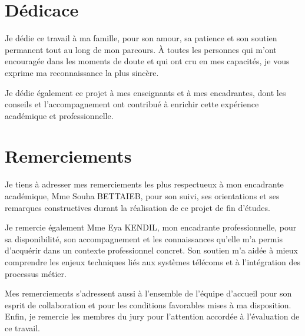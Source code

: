 \documentclass[12pt,a4paper]{report}
\begin{document}

\chapter*{Dédicace}
Je dédie ce travail à ma famille, pour son amour, sa patience et son soutien permanent tout au long de mon parcours. À toutes les personnes qui m'ont encouragée dans les moments de doute et qui ont cru en mes capacités, je vous exprime ma reconnaissance la plus sincère.

Je dédie également ce projet à mes enseignants et à mes encadrantes, dont les conseils et l'accompagnement ont contribué à enrichir cette expérience académique et professionnelle.

\chapter*{Remerciements}
Je tiens à adresser mes remerciements les plus respectueux à mon encadrante académique, Mme Souha BETTAIEB, pour son suivi, ses orientations et ses remarques constructives durant la réalisation de ce projet de fin d'études.

Je remercie également Mme Eya KENDIL, mon encadrante professionnelle, pour sa disponibilité, son accompagnement et les connaissances qu'elle m'a permis d'acquérir dans un contexte professionnel concret. Son soutien m'a aidée à mieux comprendre les enjeux techniques liés aux systèmes télécoms et à l'intégration des processus métier.

Mes remerciements s'adressent aussi à l'ensemble de l'équipe d'accueil pour son esprit de collaboration et pour les conditions favorables mises à ma disposition. Enfin, je remercie les membres du jury pour l'attention accordée à l'évaluation de ce travail.

\tableofcontents
\listoffigures
\listoftables
\end{document}
